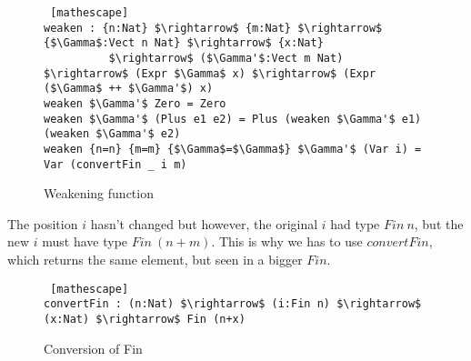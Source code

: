  \begin{figure}[H]
\figrule
\begin{center}
\begin{lstlisting} [mathescape]
weaken : {n:Nat} $\rightarrow$ {m:Nat} $\rightarrow$ {$\Gamma$:Vect n Nat} $\rightarrow$ {x:Nat} 
          $\rightarrow$ ($\Gamma'$:Vect m Nat) $\rightarrow$ (Expr $\Gamma$ x) $\rightarrow$ (Expr ($\Gamma$ ++ $\Gamma'$) x)
weaken $\Gamma'$ Zero = Zero
weaken $\Gamma'$ (Plus e1 e2) = Plus (weaken $\Gamma'$ e1) (weaken $\Gamma'$ e2)
weaken {n=n} {m=m} {$\Gamma$=$\Gamma$} $\Gamma'$ (Var i) = Var (convertFin _ i m)    
\end{lstlisting}
\end{center}
\caption{Weakening function}
\figrule
\end{figure}


The position $i$ hasn't changed but however, the original $i$ had type $Fin\ n$, but the new $i$ must have type $Fin\ (n+m)$. This is why we has to use $convertFin$, which returns the same element, but seen in a bigger $Fin$.


 \begin{figure}[H]
\figrule
\begin{center}
\begin{lstlisting} [mathescape]
convertFin : (n:Nat) $\rightarrow$ (i:Fin n) $\rightarrow$ (x:Nat) $\rightarrow$ Fin (n+x)
\end{lstlisting}
\end{center}
\caption{Conversion of Fin}
\figrule
\end{figure}




